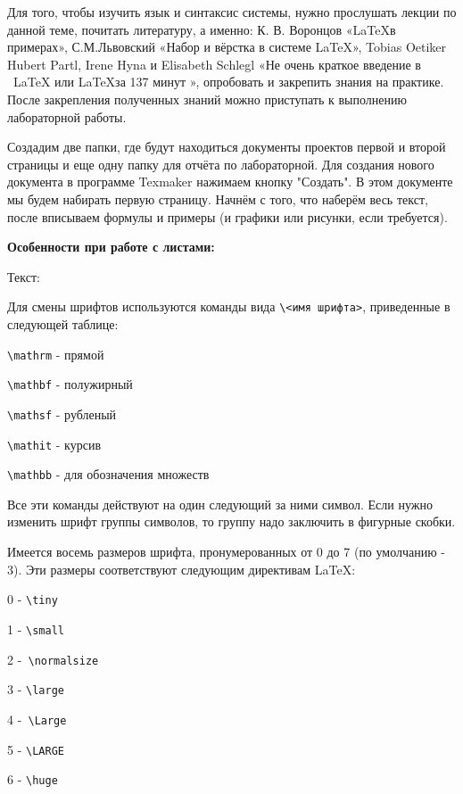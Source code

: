 \documentclass[a4paper,12pt]{article}
\begin{document}
Для того, чтобы изучить язык и синтаксис системы, нужно прослушать лекции по данной теме, почитать литературу, а именно: К. В. Воронцов «\LaTeX в примерах», С.М.Львов\-ский «Набор и вёрстка в системе \LaTeX», Tobias Oetiker
Hubert Partl, Irene Hyna и Elisabeth Schlegl «Не очень краткое введение в \ LaTeX или \LaTeX за 137 минут », опробовать и закрепить знания на практике.
После закрепления полученных знаний можно приступать к выполнению лабораторной работы. 

Создадим две папки, где будут находиться документы проектов первой и второй стра\-ницы и еще одну папку для отчёта по лабораторной. Для создания нового документа в программе Texmaker нажимаем кнопку "Создать". В этом документе мы будем набирать первую страницу. Начнём с того, что наберём весь текст, после вписываем формулы и примеры (и графики или рисунки, если требуется). 

\newpage

\begin{flushleft}
{\LARGE \bf Особенности при работе с листами:}
\end{flushleft}
\begin{flushleft}
{\Large Текст:}
\end{flushleft}

Для смены шрифтов используются команды вида \verb|\<имя шрифта>|, приведенные в следующей таблице:

\verb|\mathrm| - прямой

\verb|\mathbf| - полужирный

\verb|\mathsf| - рубленый

\verb|\mathit| - курсив

\verb|\mathbb| - для обозначения множеств

Все эти команды действуют на один следующий за ними символ. Если нужно изменить шрифт группы символов, то группу надо заключить в фигурные скобки. 

Имеется восемь размеров шрифта, пронумерованных от 0 до 7 (по умолчанию - 3).
Эти размеры соответствуют следующим директивам LaTeX:

0 - \verb|\tiny| 

1 - \verb|\small|

2 -\verb| \normalsize| 

3 - \verb|\large| 

4 -\verb| \Large|

5 - \verb|\LARGE |

6 - \verb|\huge|
\end{document}
